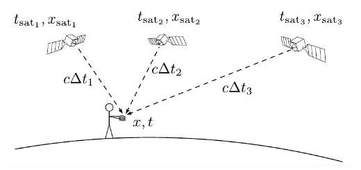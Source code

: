 {\begin{multicols}{2}
\begin{Figure}
\centering
\includegraphics[width=\textwidth]{fig_15-8.pdf}
\end{Figure}



\end{multicols}}
